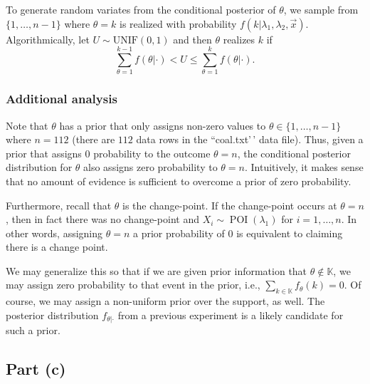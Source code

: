 \documentclass[
  11pt,
]{article}
\begin{document}
To generate random variates from the conditional posterior of
\(\theta\), we sample from \(\{1,\ldots,n-1\}\) where \(\theta=k\) is
realized with probability \(f(k|\lambda_1,\lambda_2,\vec{x})\).
Algorithmically, let \(U \sim \operatorname{UNIF(0,1)}\) and then
\(\theta\) realizes \(k\) if \[
  \sum_{\theta=1}^{k-1} f(\theta|\cdot) < U \leq \sum_{\theta=1}^{k} f(\theta|\cdot).
\]

\hypertarget{additional-analysis}{%
\subsubsection{Additional analysis}\label{additional-analysis}}

Note that \(\theta\) has a prior that only assigns non-zero values to
\(\theta \in \{1,\ldots,n-1\}\) where \(n=112\) (there are \(112\) data
rows in the ``coal.txt'\,' data file). Thus, given a prior that assigns
\(0\) probability to the outcome \(\theta=n\), the conditional posterior
distribution for \(\theta\) also assigns zero probability to
\(\theta=n\). Intuitively, it makes sense that no amount of evidence is
sufficient to overcome a prior of zero probability.

Furthermore, recall that \(\theta\) is the change-point. If the
change-point occurs at \(\theta=n\), then in fact there was no
change-point and \(X_i \sim \operatorname{POI}(\lambda_1)\) for
\(i=1,\ldots,n\). In other words, assigning \(\theta=n\) a prior
probability of \(0\) is equivalent to claiming there is a change point.

We may generalize this so that if we are given prior information that
\(\theta \notin \mathbb{K}\), we may assign zero probability to that
event in the prior, i.e., \(\sum_{k \in \mathbb{K}} f_{\theta}(k) = 0\).
Of course, we may assign a non-uniform prior over the support, as well.
The posterior distribution \(f_{\theta|\cdot}\) from a previous
experiment is a likely candidate for such a prior.

\hypertarget{part-c-1}{%
\subsection{Part (c)}\label{part-c-1}}

\end{document}
